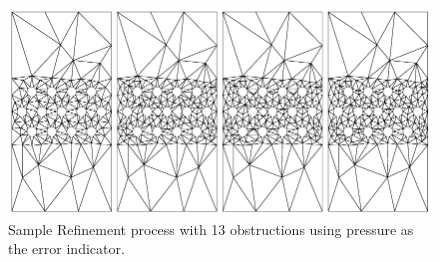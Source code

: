 \documentclass[wrr]{agutex}  %
\begin{document}
\begin{article}
\begin{figure}[h]
\includegraphics[height=\h]{../plots/p_13_row.pdf}
\caption{Sample Refinement process with 13 obstructions using pressure as the error indicator.}   
\end{figure}

\newpage
%
%

\end{article}
\end{document}
